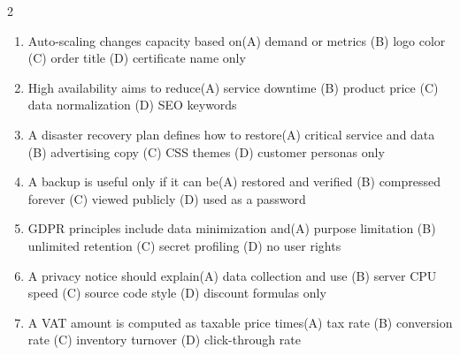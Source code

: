 \documentclass[a4paper]{article}
\begin{document}
\begin{multicols*}{2}
\begin{enumerate}[resume]
\item Auto-scaling changes capacity based on\newline\hspace*{0.6em}(A) demand or metrics \quad (B) logo color \newline\hspace*{0.6em}(C) order title \quad (D) certificate name only
\item High availability aims to reduce\newline\hspace*{0.6em}(A) service downtime \quad (B) product price \newline\hspace*{0.6em}(C) data normalization \quad (D) SEO keywords
\item A disaster recovery plan defines how to restore\newline\hspace*{0.6em}(A) critical service and data \quad (B) advertising copy \newline\hspace*{0.6em}(C) CSS themes \quad (D) customer personas only
\item A backup is useful only if it can be\newline\hspace*{0.6em}(A) restored and verified \quad (B) compressed forever \newline\hspace*{0.6em}(C) viewed publicly \quad (D) used as a password
\item GDPR principles include data minimization and\newline\hspace*{0.6em}(A) purpose limitation \quad (B) unlimited retention \newline\hspace*{0.6em}(C) secret profiling \quad (D) no user rights
\item A privacy notice should explain\newline\hspace*{0.6em}(A) data collection and use \quad (B) server CPU speed \newline\hspace*{0.6em}(C) source code style \quad (D) discount formulas only
\item A VAT amount is computed as taxable price times\newline\hspace*{0.6em}(A) tax rate \quad (B) conversion rate \newline\hspace*{0.6em}(C) inventory turnover \quad (D) click-through rate

\end{enumerate}
\end{multicols*}
\end{document}
